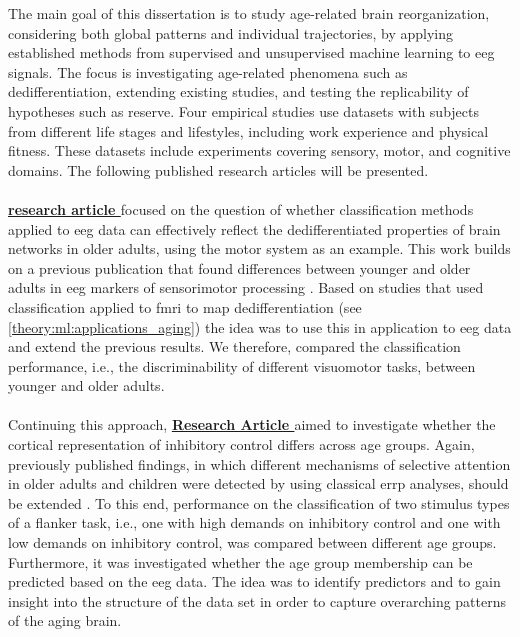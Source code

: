 The main goal of this dissertation is to study age-related brain reorganization, considering both global patterns and individual trajectories, by applying established methods from supervised and unsupervised machine learning to \gls{eeg} signals. The focus is investigating age-related phenomena such as dedifferentiation, extending existing studies, and testing the replicability of hypotheses such as reserve. Four empirical studies use datasets with subjects from different life stages and lifestyles, including work experience and physical fitness. These datasets include experiments covering sensory, motor, and cognitive domains. The following published research articles will be presented.\\
\\
\textbf{\hyperref[paperI]{research article }} focused on the question of whether classification methods applied to \gls{eeg} data can effectively reflect the dedifferentiated properties of brain networks in older adults, using the motor system as an example. This work builds on a previous publication that found differences between younger and older adults in \gls{eeg} markers of sensorimotor processing \cite{vieluf2018age}. Based on studies that used classification applied to \gls{fmri} to map dedifferentiation (see \autoref{theory:ml:applications_aging}) the idea was to use this in application to \gls{eeg} data and extend the previous results. We therefore, compared the classification performance, i.e., the discriminability of different visuomotor tasks, between younger and older adults.\\
\\
Continuing this approach, \textbf{\hyperref[paperII]{Research Article }} aimed to investigate whether the cortical representation of inhibitory control differs across age groups. Again, previously published findings, in which different mechanisms of selective attention in older adults and children were detected by using classical \gls{errp} analyses, should be extended \cite{Reuter2019}. To this end, performance on the classification of two stimulus types of a flanker task, i.e., one with high demands on inhibitory control and one with low demands on inhibitory control, was compared between different age groups. Furthermore, it was investigated whether the age group membership can be predicted based on the \gls{eeg} data. The idea was to identify predictors and to gain insight into the structure of the data set in order to capture overarching patterns of the aging brain. \\
